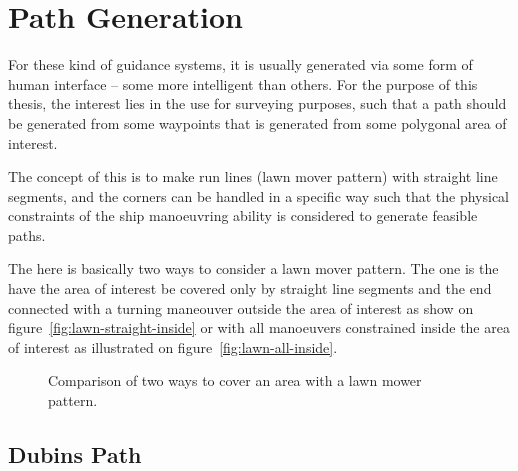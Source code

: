 \chapter{Path Generation}
\label{ch:pathgen}

For these kind of guidance systems, it is usually generated via some
form of human interface -- some more intelligent than others. For the
purpose of this thesis, the interest lies in the use for surveying
purposes, such that a path should be generated from some waypoints
that is generated from some polygonal area of interest.

The concept of this is to make run lines (lawn mover pattern) with
straight line segments, and the corners can be handled in a specific
way such that the physical constraints of the ship manoeuvring ability
is considered to generate feasible paths.

The here is basically two ways to consider a lawn mover pattern. The
one is the have the area of interest be covered only by straight line
segments and the end connected with a turning maneouver outside the
area of interest as show on figure~\vref{fig:lawn-straight-inside} or
with all manoeuvers constrained inside the area of interest as
illustrated on figure~\vref{fig:lawn-all-inside}.

\begin{figure}[htbp]
	\centering
	\qquad
	\caption{Comparison of two ways to cover an area with a lawn mower
	pattern.}
\end{figure}

\section{Dubins Path}


